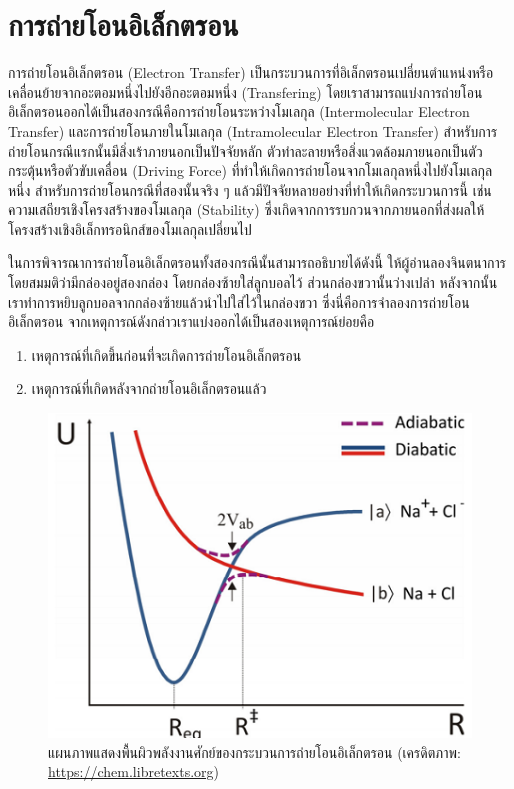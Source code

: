 \section{การถ่ายโอนอิเล็กตรอน}
\label{sec:et}

การถ่ายโอนอิเล็กตรอน (Electron Transfer) เป็นกระบวนการที่อิเล็กตรอนเปลี่ยนตำแหน่งหรือเคลื่อนย้ายจากอะตอมหนึ่งไปยังอีกอะตอมหนึ่ง (Transfering) โดยเราสามารถแบ่งการถ่ายโอนอิเล็กตรอนออกได้เป็นสองกรณีคือการถ่ายโอนระหว่างโมเลกุล (Intermolecular Electron Transfer) และการถ่ายโอนภายในโมเลกุล (Intramolecular Electron Transfer) สำหรับการถ่ายโอนกรณีแรกนั้นมีสิ่งเร้าภายนอกเป็นปัจจัยหลัก ตัวทำละลายหรือสิ่งแวดล้อมภายนอกเป็นตัวกระตุ้นหรือตัวขับเคลื่อน (Driving Force) ที่ทำให้เกิดการถ่ายโอนจากโมเลกุลหนึ่งไปยังโมเลกุลหนึ่ง สำหรับการถ่ายโอนกรณีที่สองนั้นจริง ๆ แล้วมีปัจจัยหลายอย่างที่ทำให้เกิดกระบวนการนี้ เช่น ความเสถียรเชิงโครงสร้างของโมเลกุล (Stability) ซึ่งเกิดจากการรบกวนจากภายนอกที่ส่งผลให้โครงสร้างเชิงอิเล็กทรอนิกส์ของโมเลกุลเปลี่ยนไป

ในการพิจารณาการถ่ายโอนอิเล็กตรอนทั้งสองกรณีนั้นสามารถอธิบายได้ดังนี้ ให้ผู้อ่านลองจินตนาการโดยสมมติว่ามีกล่องอยู่สองกล่อง โดยกล่องซ้ายใส่ลูกบอลไว้ ส่วนกล่องขวานั้นว่างเปล่า หลังจากนั้นเราทำการหยิบลูกบอลจากกล่องซ้ายแล้วนำไปใส่ไว้ในกล่องขวา ซึ่งนี่คือการจำลองการถ่ายโอนอิเล็กตรอน จากเหตุการณ์ดังกล่าวเราแบ่งออกได้เป็นสองเหตุการณ์ย่อยคือ
%
\begin{enumerate}[topsep=0pt,noitemsep]\setlength\itemsep{0.5em}
    \item เหตุการณ์ที่เกิดขึ้นก่อนที่จะเกิดการถ่ายโอนอิเล็กตรอน

    \item เหตุการณ์ที่เกิดหลังจากถ่ายโอนอิเล็กตรอนแล้ว
\end{enumerate}

\begin{figure}[H]
    \centering
    \includegraphics[width=0.5\linewidth]{fig/et_diagram.png}
    \caption{แผนภาพแสดงพื้นผิวพลังงานศักย์ของกระบวนการถ่ายโอนอิเล็กตรอน (เครดิตภาพ: \url{https://chem.libretexts.org})}
    \label{fig:et_diagram}
\end{figure}

